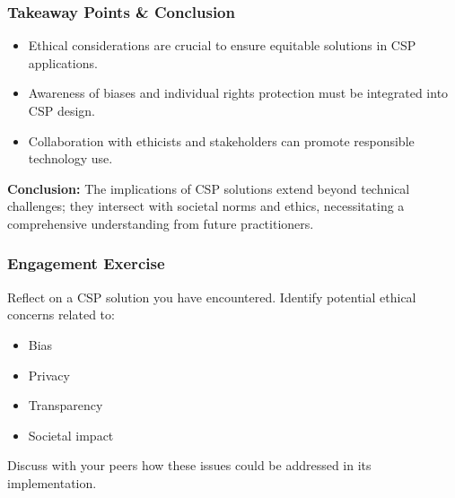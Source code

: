\documentclass[aspectratio=169]{beamer}
\begin{document}
\begin{frame}[fragile]
    \frametitle{Takeaway Points & Conclusion}
    \begin{itemize}
        \item Ethical considerations are crucial to ensure equitable solutions in CSP applications.
        \item Awareness of biases and individual rights protection must be integrated into CSP design.
        \item Collaboration with ethicists and stakeholders can promote responsible technology use.
    \end{itemize}
    
    \textbf{Conclusion:} The implications of CSP solutions extend beyond technical challenges; they intersect with societal norms and ethics, necessitating a comprehensive understanding from future practitioners.
\end{frame}

\begin{frame}[fragile]
    \frametitle{Engagement Exercise}
    Reflect on a CSP solution you have encountered. Identify potential ethical concerns related to:
    \begin{itemize}
        \item Bias
        \item Privacy
        \item Transparency
        \item Societal impact
    \end{itemize}
    Discuss with your peers how these issues could be addressed in its implementation.
\end{frame}
\end{document}
